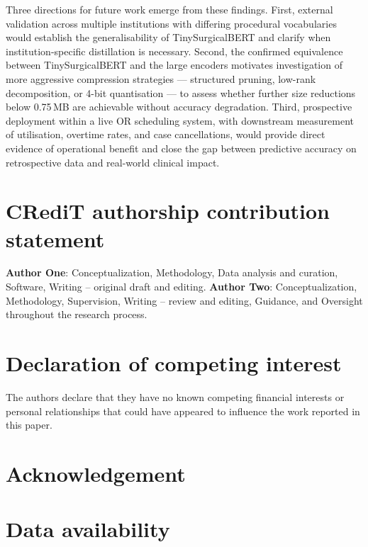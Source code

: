 \documentclass[3p]{elsarticle}
\begin{document}
Three directions for future work emerge from these findings. First, external validation across multiple institutions with differing procedural vocabularies would establish the generalisability of TinySurgicalBERT and clarify when institution-specific distillation is necessary. Second, the confirmed equivalence between TinySurgicalBERT and the large encoders motivates investigation of more aggressive compression strategies — structured pruning, low-rank decomposition, or 4-bit quantisation — to assess whether further size reductions below 0.75\,MB are achievable without accuracy degradation. Third, prospective deployment within a live OR scheduling system, with downstream measurement of utilisation, overtime rates, and case cancellations, would provide direct evidence of operational benefit and close the gap between predictive accuracy on retrospective data and real-world clinical impact.

\section*{CRediT authorship contribution statement}
\textbf{Author One}: Conceptualization, Methodology, Data analysis and curation,
Software, Writing -- original draft and editing.
\textbf{Author Two}: Conceptualization, Methodology, Supervision,
Writing -- review and editing, Guidance, and Oversight throughout the research process.

\section*{Declaration of competing interest}
The authors declare that they have no known competing financial interests or
personal relationships that could have appeared to influence the work reported
in this paper.

\section*{Acknowledgement}

\section*{Data availability}



\end{document}
